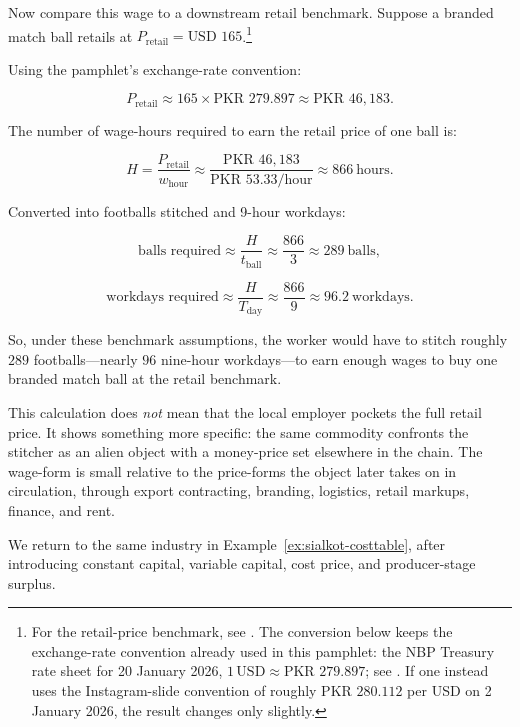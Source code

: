 \begin{example}
Now compare this wage to a downstream retail benchmark. Suppose a branded match
ball retails at \(P_{\text{retail}}=\text{USD }165\).\footnote{For the retail-price
benchmark, see \cite{GoalAlRihla2022}. The conversion below keeps the exchange-rate
convention already used in this pamphlet: the NBP Treasury rate sheet for
20 January 2026, \(1\,\text{USD} \approx \text{PKR }279.897\); see
\cite{NBPRateSheet20Jan2026}. If one instead uses the Instagram-slide convention
of roughly PKR \(280.112\) per USD on 2 January 2026, the result changes only
slightly.}

Using the pamphlet's exchange-rate convention:

\[
P_{\text{retail}}
\approx
165\times \text{PKR }279.897
\approx
\text{PKR }46{,}183.
\]

The number of wage-hours required to earn the retail price of one ball is:

\[
H
=
\frac{P_{\text{retail}}}{w_{\text{hour}}}
\approx
\frac{\text{PKR }46{,}183}{\text{PKR }53.33/\text{hour}}
\approx
866\ \text{hours}.
\]

Converted into footballs stitched and 9-hour workdays:

\[
\text{balls required}
\approx
\frac{H}{t_{\text{ball}}}
\approx
\frac{866}{3}
\approx
289\ \text{balls},
\]

\[
\text{workdays required}
\approx
\frac{H}{T_{\text{day}}}
\approx
\frac{866}{9}
\approx
96.2\ \text{workdays}.
\]

So, under these benchmark assumptions, the worker would have to stitch roughly
\(289\) footballs---nearly \(96\) nine-hour workdays---to earn enough
wages to buy one branded match ball at the retail benchmark.

This calculation does \emph{not} mean that the local employer pockets the full
retail price. It shows something more specific: the same commodity confronts the
stitcher as an alien object with a money-price set elsewhere in the chain. The
wage-form is small relative to the price-forms the object later takes on in
circulation, through export contracting, branding, logistics, retail markups,
finance, and rent.

We return to the same industry in Example~\ref{ex:sialkot-costtable}, after
introducing constant capital, variable capital, cost price, and producer-stage
surplus.

\end{example}

